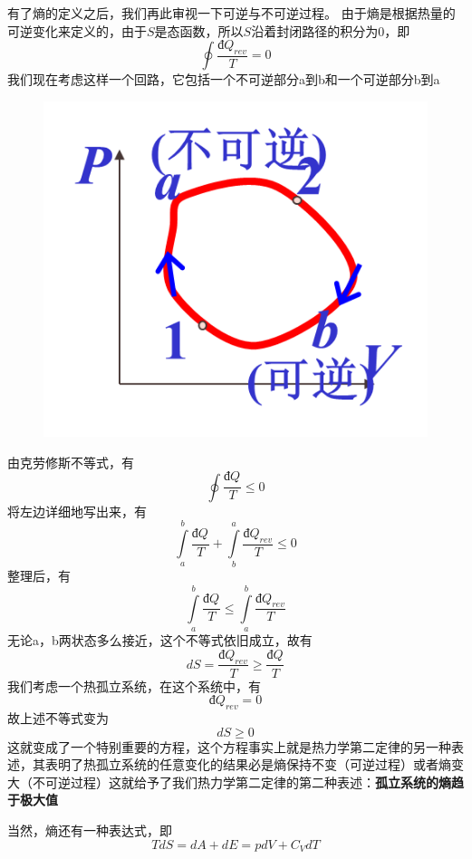 \documentclass[lang=cn,10pt]{elegantbook}
\begin{document}
	有了熵的定义之后，我们再此审视一下可逆与不可逆过程。
	由于熵是根据热量的可逆变化来定义的，由于$S$是态函数，所以$S$沿着封闭路径的积分为0，即
	\begin{equation*}
		\oint{\frac{\text{đ}Q_{rev}}{T}}=0
	\end{equation*}
	我们现在考虑这样一个回路，它包括一个不可逆部分a到b和一个可逆部分b到a
	\begin{figure}[H]
		\centering
		\includegraphics[width=0.2\linewidth]{screenshot013}
		\caption{}
		\label{fig:screenshot013}
	\end{figure}
	由克劳修斯不等式，有
	\begin{equation*}
		\oint{\frac{\text{đ}Q_{}}{T}}\le0
	\end{equation*}
	将左边详细地写出来，有
	\begin{equation*}
		\int\limits_a^b{\frac{\text{đ}Q_{}}{T}}+\int\limits_b^a{\frac{\text{đ}Q_{rev}}{T}}\le0
	\end{equation*}
	整理后，有
	\begin{equation*}
		\int\limits_a^b{\frac{\text{đ}Q_{}}{T}}\le\int\limits_a^b{\frac{\text{đ}Q_{rev}}{T}} 
	\end{equation*}
	无论a，b两状态多么接近，这个不等式依旧成立，故有
	\begin{equation*}
		dS=\frac{\text{đ}Q_{rev}}{T}\ge\frac{\text{đ}Q_{}}{T}
	\end{equation*}
	我们考虑一个热孤立系统，在这个系统中，有
	\begin{equation*}
		\text{đ}Q_{rev}=0
	\end{equation*}
	故上述不等式变为
	\begin{equation*}
		dS\ge 0
	\end{equation*}
	这就变成了一个特别重要的方程，这个方程事实上就是热力学第二定律的另一种表述，其表明了热孤立系统的任意变化的结果必是熵保持不变（可逆过程）或者熵变大（不可逆过程）这就给予了我们热力学第二定律的第二种表述：\textbf{孤立系统的熵趋于极大值}
	
	当然，熵还有一种表达式，即
	\begin{equation*}
		TdS=dA+dE=pdV+C_{V}dT
	\end{equation*}
	
\end{document}

